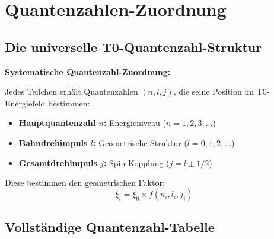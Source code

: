 \documentclass[12pt,a4paper]{article}
\begin{document}
	\section{Quantenzahlen-Zuordnung}
	
	\subsection{Die universelle T0-Quantenzahl-Struktur}
	
	\begin{method}
		\textbf{Systematische Quantenzahl-Zuordnung:}
		
		Jedes Teilchen erhält Quantenzahlen $(n,l,j)$, die seine Position im T0-Energiefeld bestimmen:
		
		\begin{itemize}
			\item \textbf{Hauptquantenzahl $n$:} Energieniveau ($n = 1,2,3,...$)
			\item \textbf{Bahndrehimpuls $l$:} Geometrische Struktur ($l = 0,1,2,...$)
			\item \textbf{Gesamtdrehimpuls $j$:} Spin-Kopplung ($j = l \pm 1/2$)
		\end{itemize}
		
		Diese bestimmen den geometrischen Faktor:
		\begin{equation}
			\xi_i = \xi_0 \times f(n_i, l_i, j_i)
		\end{equation}
	\end{method}
	
	\subsection{Vollständige Quantenzahl-Tabelle}
	
\end{document}
